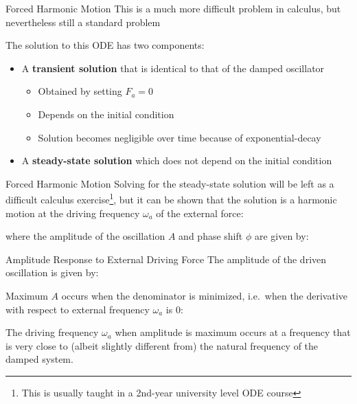 \documentclass[12pt,compress,aspectratio=169]{beamer}
\begin{document}
\begin{frame}{Forced Harmonic Motion}
  This is a much more difficult problem in calculus, but nevertheless still a
  standard problem
  
  
  The solution to this ODE has two components:
  \begin{itemize}
  \item A \textbf{transient solution} that is identical to that of the damped
    oscillator
    \begin{itemize}
    \item Obtained by setting $F_a=0$
    \item Depends on the initial condition
    \item Solution becomes negligible over time because of exponential-decay
    \end{itemize}
  \item A \textbf{steady-state solution} which does not depend on the initial
    condition
  \end{itemize}
\end{frame}



\begin{frame}{Forced Harmonic Motion}
  Solving for the steady-state solution will be left as a difficult calculus
  exercise\footnote{This is usually taught in a 2nd-year university level ODE
  course}, but it can be shown that the solution is a harmonic motion at the
  driving frequency $\omega_a$ of the external force:

  
  where the amplitude of the oscillation $A$ and phase shift $\phi$ are given
  by:

  \vspace{.5in}
\end{frame}



\begin{frame}{Amplitude Response to External Driving Force}
  The amplitude of the driven oscillation is given by:
  
  
  Maximum $A$ occurs when the denominator is minimized, i.e.\ when the
  derivative with respect to external frequency $\omega_a$ is 0:


  The driving frequency $\omega_a$ when amplitude is maximum occurs at a
  frequency that is very close to (albeit slightly different from) the natural
  frequency of the damped system.
\end{frame}
\end{document}
